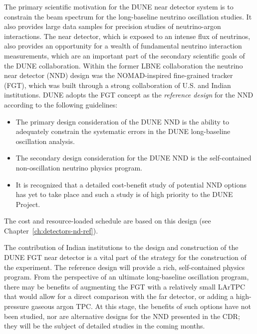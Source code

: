 The
primary scientific motivation for the DUNE near detector system is to
constrain the beam spectrum for the long-baseline neutrino oscillation
studies. It also provides large data samples for precision studies of
neutrino-argon interactions. The near detector, which is exposed to an
intense flux of neutrinos, also provides an opportunity for a wealth
of fundamental neutrino interaction measurements, which are an
important part of the secondary scientific goals of the DUNE
collaboration. 
Within the former LBNE collaboration the neutrino near
detector (NND) design was the NOMAD-inspired fine-grained tracker
(FGT), which was built through a strong collaboration of U.S. and
Indian institutions. DUNE adopts the FGT concept as the 
\textit{reference design} for the NND according to the following guidelines:
\begin{itemize}
\item The primary design consideration of the DUNE NND
is the ability to adequately constrain the systematic
  errors in the DUNE long-baseline oscillation analysis.
\item The secondary design consideration for the DUNE NND is the
  self-contained non-oscillation neutrino physics program.
\item It is recognized that a detailed cost-benefit study of potential
  NND options has yet to take place and such a study is of high
  priority to the DUNE Project. 
\end{itemize}
The cost and resource-loaded schedule are based on this design (see
Chapter~\ref{ch:detectors-nd-ref}).

The contribution of Indian institutions to the design and construction
of the DUNE FGT %
near detector is a vital part of the strategy
for the construction of the experiment. The reference design will
provide a rich, self-contained physics program. From the perspective of
an ultimate  long-baseline oscillation program, there may be benefits
of augmenting the FGT with a relatively small LArTPC that would allow
for a direct comparison with the far detector, or adding a high-pressure
gaseous argon TPC. At this stage, the benefits of such options have
not been studied, nor are alternative designs for the NND presented
in the CDR; they will be the subject of detailed studies in the coming
months.

